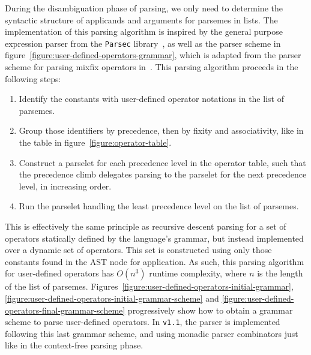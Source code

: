 During the disambiguation phase of parsing, we only need to determine the syntactic structure of applicands and arguments for parsemes in lists.
The implementation of this parsing algorithm is inspired by the general purpose expression parser from the \texttt{Parsec} library~\cite{leijen2001parsec}, as well as the parser scheme in figure~\ref{figure:user-defined-operators-grammar}, which is adapted from the parser scheme for parsing mixfix operators in~\cite{danielsson2008parsing}.
This parsing algorithm proceeds in the following steps:
\begin{enumerate}
\item Identify the constants with user-defined operator notations in the list of parsemes.
\item Group those identifiers by precedence, then by fixity and associativity, like in the table in figure~\ref{figure:operator-table}.
\item Construct a parselet for each precedence level in the operator table, such that the precedence climb delegates parsing to the parselet for the next precedence level, in increasing order.
\item Run the parselet handling the least precedence level on the list of parsemes.
\end{enumerate}
This is effectively the same principle as recursive descent parsing for a set of operators statically defined by the language's grammar, but instead implemented over a dynamic set of operators.
This set is constructed using only those constants found in the \ac{AST} node for application.
As such, this parsing algorithm for user-defined operators has $ O(n^3) $ runtime complexity, where $ n $ is the length of the list of parsemes.
Figures~\ref{figure:user-defined-operators-initial-grammar}, \ref{figure:user-defined-operators-initial-grammar-scheme} and \ref{figure:user-defined-operators-final-grammar-scheme} progressively show how to obtain a grammar scheme to parse user-defined operators.
In \Beluga \texttt{v1.1}, the parser is implemented following this last grammar scheme, and using monadic parser combinators just like in the context-free parsing phase.

